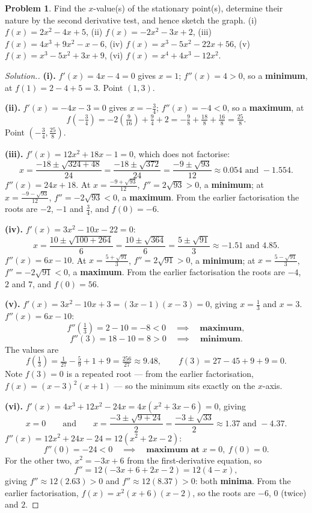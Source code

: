 \documentclass[11pt,a4paper]{article}
\theoremstyle{definition}
\newtheorem{problemx}{Problem}[section]
\newenvironment{problem}{\begin{problemx}}{\end{problemx}}
\newenvironment{solution}
  {\renewcommand{\qedsymbol}{}\begin{proof}[\textit{Solution}.]}
  {\end{proof}}
\begin{document}
\begin{problem}
Find the $x$-value(s) of the stationary point(s), determine their nature by the second
derivative test, and hence sketch the graph.
\quad (i) $f(x)=2x^2-4x+5$, \quad (ii) $f(x)=-2x^2-3x+2$, \quad
(iii) $f(x)=4x^3+9x^2-x-6$, \quad (iv) $f(x)=x^3-5x^2-22x+56$, \quad
(v) $f(x)=x^3-5x^2+3x+9$, \quad (vi) $f(x)=x^4+4x^3-12x^2$.
\end{problem}

\begin{solution}
\textbf{(i).} $f'(x)=4x-4=0$ gives $x=1$; $f''(x)=4>0$, so a \textbf{minimum}, at
$f(1)=2-4+5=3$. Point $(1,3)$.

\textbf{(ii).} $f'(x)=-4x-3=0$ gives $x=-\frac{3}{4}$; $f''(x)=-4<0$, so a
\textbf{maximum}, at
$$f\left(-\tfrac{3}{4}\right)=-2\left(\tfrac{9}{16}\right)+\tfrac{9}{4}+2
=-\tfrac{9}{8}+\tfrac{18}{8}+\tfrac{16}{8}=\tfrac{25}{8}.$$
Point $\left(-\frac{3}{4},\frac{25}{8}\right)$.

\textbf{(iii).} $f'(x)=12x^2+18x-1=0$, which does not factorise:
$$x=\frac{-18\pm\sqrt{324+48}}{24}=\frac{-18\pm\sqrt{372}}{24}
=\frac{-9\pm\sqrt{93}}{12}\approx 0.054 \text{ and } -1.554.$$
$f''(x)=24x+18$. At $x=\frac{-9+\sqrt{93}}{12}$, $f''=2\sqrt{93}>0$, a
\textbf{minimum}; at $x=\frac{-9-\sqrt{93}}{12}$, $f''=-2\sqrt{93}<0$, a
\textbf{maximum}. From the earlier factorisation the roots are $-2$, $-1$ and $\frac{3}{4}$, and
$f(0)=-6$.

\textbf{(iv).} $f'(x)=3x^2-10x-22=0$:
$$x=\frac{10\pm\sqrt{100+264}}{6}=\frac{10\pm\sqrt{364}}{6}=\frac{5\pm\sqrt{91}}{3}
\approx -1.51 \text{ and } 4.85.$$
$f''(x)=6x-10$. At $x=\frac{5+\sqrt{91}}{3}$, $f''=2\sqrt{91}>0$, a \textbf{minimum};
at $x=\frac{5-\sqrt{91}}{3}$, $f''=-2\sqrt{91}<0$, a \textbf{maximum}. From the earlier factorisation the
roots are $-4$, $2$ and $7$, and $f(0)=56$.

\textbf{(v).} $f'(x)=3x^2-10x+3=(3x-1)(x-3)=0$, giving $x=\frac{1}{3}$ and $x=3$.
$f''(x)=6x-10$:
$$f''\left(\tfrac{1}{3}\right)=2-10=-8<0\quad\implies\quad \textbf{maximum},$$
$$f''(3)=18-10=8>0\quad\implies\quad \textbf{minimum}.$$
The values are
$$f\left(\tfrac{1}{3}\right)=\tfrac{1}{27}-\tfrac{5}{9}+1+9=\tfrac{256}{27}
\approx 9.48,\qquad f(3)=27-45+9+9=0.$$
Note $f(3)=0$ is a repeated root --- from the earlier factorisation, $f(x)=(x-3)^2(x+1)$ --- so the
minimum sits exactly on the $x$-axis.

\textbf{(vi).} $f'(x)=4x^3+12x^2-24x=4x\left(x^2+3x-6\right)=0$, giving
$$x=0\qquad\text{and}\qquad x=\frac{-3\pm\sqrt{9+24}}{2}=\frac{-3\pm\sqrt{33}}{2}
\approx 1.37 \text{ and } -4.37.$$
$f''(x)=12x^2+24x-24=12\left(x^2+2x-2\right)$:
$$f''(0)=-24<0\quad\implies\quad \textbf{maximum at } x=0,\ f(0)=0.$$
For the other two, $x^2=-3x+6$ from the first-derivative equation, so
$$f''=12\left(-3x+6+2x-2\right)=12(4-x),$$
giving $f''\approx 12(2.63)>0$ and $f''\approx 12(8.37)>0$: both \textbf{minima}.
From the earlier factorisation, $f(x)=x^2(x+6)(x-2)$, so the roots are $-6$, $0$ (twice) and $2$.


\end{solution}
\end{document}
